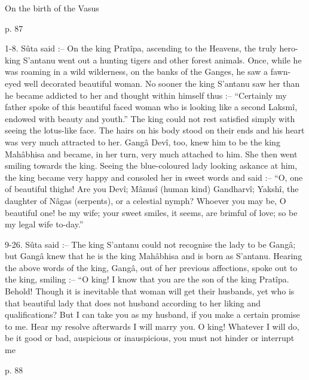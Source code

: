 ﻿On the birth of the Vasus

 

p. 87

 

1-8. Sûta said :-- On the king Pratîpa, ascending to the Heavens, the truly hero-king S’antanu went out a hunting tigers and other forest animals. Once, while he was roaming in a wild wilderness, on the banks of the Ganges, he saw a fawn-eyed well decorated beautiful woman. No sooner the king S’antanu saw her than he became addicted to her and thought within himself thus :-- “Certainly my father spoke of this beautiful faced woman who is looking like a second Laksmî, endowed with beauty and youth.” The king could not rest satisfied simply with seeing the lotus-like face. The hairs on his body stood on their ends and his heart was very much attracted to her. Gangâ Devî, too, knew him to be the king Mahâbhisa and became, in her turn, very much attached to him. She then went smiling towards the king. Seeing the blue-coloured lady looking askance at him, the king became very happy and consoled her in sweet words and said :-- “O, one of beautiful thighs! Are you Devî; Mânusî (human kind) Gandharvî; Yakshî, the daughter of Nâgas (serpents), or a celestial nymph? Whoever you may be, O beautiful one! be my wife; your sweet smiles, it seems, are brimful of love; so be my legal wife to-day.”

 

9-26. Sûta said :-- The king S’antanu could not recognise the lady to be Gangâ; but Gangâ knew that he is the king Mahâbhisa and is born as S’antanu. Hearing the above words of the king, Gangâ, out of her previous affections, spoke out to the king, smiling :-- “O king! I know that you are the son of the king Pratîpa. Behold! Though it is inevitable that woman will get their husbands, yet who is that beautiful lady that does not husband according to her liking and qualifications? But I can take you as my husband, if you make a certain promise to me. Hear my resolve afterwards I will marry you. O king! Whatever I will do, be it good or bad, auspicious or inauspicious, you must not hinder or interrupt me

 

p. 88

 

